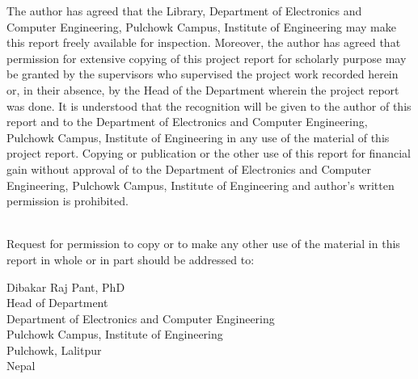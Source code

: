 \thispagestyle{plain}
\begin{center}
	\large
	\vspace{0.4cm}
	\hspace{0cm}
\end{center}

The author has agreed that the Library, Department of Electronics and Computer Engineering, Pulchowk Campus, Institute of Engineering may make this report freely available for inspection. Moreover, the author has agreed that permission for extensive copying of this project report for scholarly purpose may be granted by the supervisors who supervised the project work recorded herein or, in their absence, by the Head of the Department wherein the project report was done. It is understood that the recognition will be given to the author of this report and to the Department of Electronics and Computer Engineering, Pulchowk Campus, Institute of Engineering in any use of the material of this project report. Copying or publication or the other use of this report for financial gain without approval of to the Department of Electronics and Computer Engineering, Pulchowk Campus, Institute of Engineering and author’s written permission is prohibited.\\
\\
\hspace{0cm}

Request for permission to copy or to make any other use of the material in this report in whole or in part should be addressed to:


\vspace{0.2cm}
\begin{flushleft}

Dibakar Raj Pant, PhD\\
Head of Department\\
Department of Electronics and Computer Engineering\\
Pulchowk Campus, Institute of Engineering\\
Pulchowk, Lalitpur\\
Nepal
\end{flushleft}

